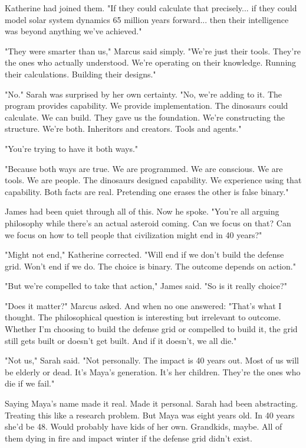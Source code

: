 Katherine had joined them. "If they could calculate that precisely... if they could model solar system dynamics 65 million years forward... then their intelligence was beyond anything we've achieved."

"They were smarter than us," Marcus said simply. "We're just their tools. They're the ones who actually understood. We're operating on their knowledge. Running their calculations. Building their designs."

"No." Sarah was surprised by her own certainty. "No, we're adding to it. The program provides capability. We provide implementation. The dinosaurs could calculate. We can build. They gave us the foundation. We're constructing the structure. We're both. Inheritors and creators. Tools and agents."

"You're trying to have it both ways."

"Because both ways are true. We are programmed. We are conscious. We are tools. We are people. The dinosaurs designed capability. We experience using that capability. Both facts are real. Pretending one erases the other is false binary."

James had been quiet through all of this. Now he spoke. "You're all arguing philosophy while there's an actual asteroid coming. Can we focus on that? Can we focus on how to tell people that civilization might end in 40 years?"

"Might not end," Katherine corrected. "Will end if we don't build the defense grid. Won't end if we do. The choice is binary. The outcome depends on action."

"But we're compelled to take that action," James said. "So is it really choice?"

"Does it matter?" Marcus asked. And when no one answered: "That's what I thought. The philosophical question is interesting but irrelevant to outcome. Whether I'm choosing to build the defense grid or compelled to build it, the grid still gets built or doesn't get built. And if it doesn't, we all die."

"Not us," Sarah said. "Not personally. The impact is 40 years out. Most of us will be elderly or dead. It's Maya's generation. It's her children. They're the ones who die if we fail."

Saying Maya's name made it real. Made it personal. Sarah had been abstracting. Treating this like a research problem. But Maya was eight years old. In 40 years she'd be 48. Would probably have kids of her own. Grandkids, maybe. All of them dying in fire and impact winter if the defense grid didn't exist.

